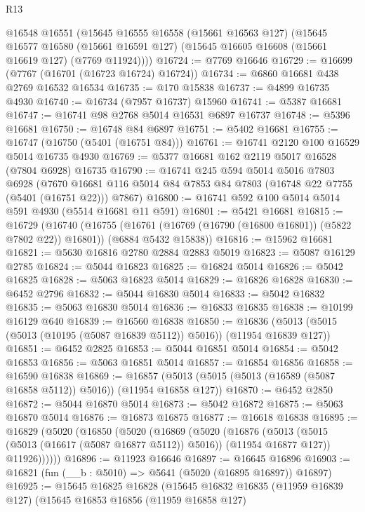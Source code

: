 \begin{lexlean}{R13}
\begin{coremodule}
    @16548
    @16551
    (@15645
      @16555
      @16558
      (@15661 @16563 @127)
      (@15645
        @16577
        @16580
        (@15661 @16591 @127)
        (@15645 @16605 @16608 (@15661 @16619 @127) (@7769 @11924))))
@16724 := @7769 @16646
@16729 := @16699 (@7767 (@16701 (@16723 @16724) @16724))
@16734 := @6860 @16681 @438 @2769 @16532 @16534
@16735 := @170 @15838
@16737 := @4899 @16735 @4930
@16740 := @16734 (@7957 @16737) @15960
@16741 := @5387 @16681
@16747 := @16741 @98 @2768 @5014 @16531 @6897 @16737
@16748 := @5396 @16681
@16750 := @16748 @84 @6897
@16751 := @5402 @16681
@16755 := @16747 (@16750 (@5401 (@16751 @84)))
@16761 := @16741 @2120 @100 @16529 @5014 @16735 @4930
@16769 := @5377 @16681 @162 @2119 @5017 @16528 (@7804 @6928) @16735
@16790 := @16741
    @245
    @594
    @5014
    @5016
    @7803
    @6928
    (@7670 @16681 @116 @5014 @84 @7853 @84 @7803 (@16748 @22 @7755 (@5401 (@16751 @22))) @7867)
@16800 := @16741 @592 @100 @5014 @5014 @591 @4930 (@5514 @16681 @11 @591)
@16801 := @5421 @16681
@16815 := @16729
    (@16740
      (@16755 (@16761 (@16769 (@16790 (@16800 @16801)) (@5822 @7802 @22)) @16801))
      (@6884 @5432 @15838))
@16816 := @15962 @16681
@16821 := @5630 @16816 @2780 @2884 @2883 @5019
@16823 := @5087 @16129 @2785
@16824 := @5044 @16823
@16825 := @16824 @5014
@16826 := @5042 @16825
@16828 := @5063 @16823 @5014
@16829 := @16826 @16828
@16830 := @6452 @2796
@16832 := @5044 @16830 @5014
@16833 := @5042 @16832
@16835 := @5063 @16830 @5014
@16836 := @16833 @16835
@16838 := @10199 @16129 @640
@16839 := @16560 @16838
@16850 := @16836 (@5013 (@5015 (@5013 (@10195 (@5087 @16839 @5112)) @5016)) (@11954 @16839 @127))
@16851 := @6452 @2825
@16853 := @5044 @16851 @5014
@16854 := @5042 @16853
@16856 := @5063 @16851 @5014
@16857 := @16854 @16856
@16858 := @16590 @16838
@16869 := @16857 (@5013 (@5015 (@5013 (@16589 (@5087 @16858 @5112)) @5016)) (@11954 @16858 @127))
@16870 := @6452 @2850
@16872 := @5044 @16870 @5014
@16873 := @5042 @16872
@16875 := @5063 @16870 @5014
@16876 := @16873 @16875
@16877 := @16618 @16838
@16895 := @16829
    (@5020
      (@16850
        (@5020
          (@16869
            (@5020
              (@16876
                (@5013 (@5015 (@5013 (@16617 (@5087 @16877 @5112)) @5016)) (@11954 @16877 @127))
                @11926))))))
@16896 := @11923 @16646
@16897 := @16645 @16896
@16903 := @16821 (fun (__b : @5010) => @5641 (@5020 (@16895 @16897)) @16897)
@16925 := @15645
    @16825
    @16828
    (@15645
      @16832
      @16835
      (@11959 @16839 @127)
      (@15645
        @16853
        @16856
        (@11959 @16858 @127)

\end{coremodule}
\end{lexlean}
